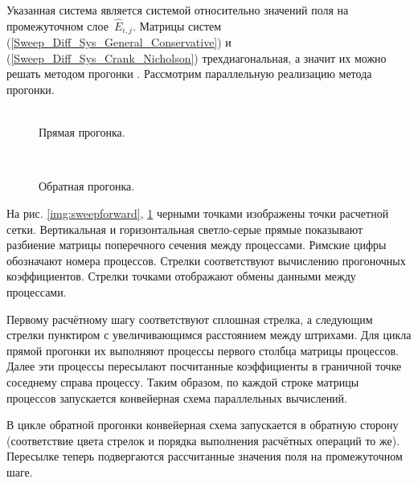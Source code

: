Указанная система является системой относительно значений поля на промежуточном слое~$\hat{E}_{i,j}$.
Матрицы систем (\ref{Sweep_Diff_Sys_General_Conservative}) и (\ref{Sweep_Diff_Sys_Crank_Nicholson}) трехдиагональная, а значит их можно решать методом прогонки \cite{Kalitkin}.
Рассмотрим параллельную реализацию метода прогонки.

\begin{figure}[h]
    \begin{center}
        \begin{minipage}{0.45\linewidth}
             \\
            \caption{Прямая прогонка.}
            \label{img:sweepforward}
        \end{minipage}
        \hfill
        \begin{minipage}{0.45\linewidth}
             \\
            \caption{Обратная прогонка.}
            \label{img:sweepbackward}
        \end{minipage}
    \end{center}
\end{figure}

На рис. \ref{img:sweepforward}, \ref{img:sweepbackward} черными точками изображены точки расчетной сетки.
Вертикальная и горизонтальная светло-серые прямые показывают разбиение матрицы поперечного сечения между процессами.
Римские цифры обозначают номера процессов.
Стрелки соответствуют вычислению прогоночных коэффициентов.
Стрелки точками отображают обмены данными между процессами.

Первому расчётному шагу соответствуют сплошная стрелка, а следующим стрелки пунктиром с увеличивающимся расстоянием между штрихами.
Для цикла прямой прогонки их выполняют процессы первого столбца матрицы процессов.
Далее эти процессы пересылают посчитанные коэффициенты в граничной точке соседнему справа процессу.
Таким образом, по каждой строке матрицы процессов запускается конвейерная схема параллельных вычислений.

В цикле обратной прогонки конвейерная схема запускается в обратную сторону (соответствие цвета стрелок и порядка выполнения расчётных операций то же).
Пересылке теперь подвергаются рассчитанные значения поля на промежуточном шаге.


